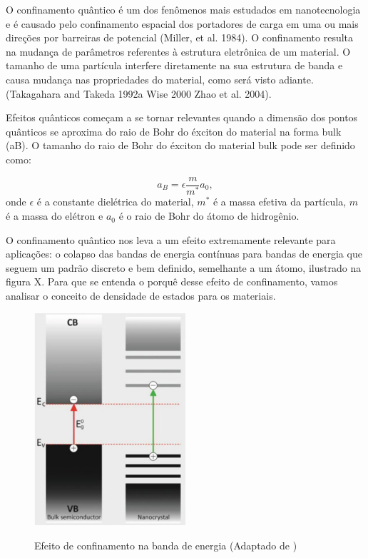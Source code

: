 \par O confinamento quântico é um  dos fenômenos mais estudados em nanotecnologia e é causado pelo confinamento espacial dos portadores de carga em uma ou mais direções por barreiras de potencial (Miller, et al. 1984). O confinamento resulta na mudança de parâmetros referentes à estrutura eletrônica de um material. O tamanho de uma partícula interfere diretamente na sua estrutura de banda e causa mudança nas propriedades do material, como será visto adiante. (Takagahara and Takeda  1992a Wise  2000 Zhao  et  al.  2004).

\par Efeitos quânticos começam a se tornar relevantes quando a dimensão dos pontos quânticos se aproxima do raio de Bohr do éxciton do material na forma bulk (aB). O tamanho do raio de Bohr do éxciton do material bulk pode ser definido\cite{confinamento1} como:

\begin{equation}
	\label{confinamento_1}
	a_{B} = \epsilon \frac{m}{m^{\ast}}a_{0},
\end{equation}
onde $\epsilon$ é a constante dielétrica do material, $m^{\ast}$ é a massa efetiva da partícula, $m$ é a massa do elétron e $a_{0}$ é o raio de Bohr do átomo de hidrogênio.
 
\par O confinamento quântico nos leva a um efeito extremamente relevante para aplicações: o colapso das bandas de energia contínuas para bandas de energia que seguem um padrão discreto e bem definido, semelhante a um átomo, ilustrado na figura X. Para que se entenda o porquê desse efeito de confinamento, vamos analisar o conceito de densidade de estados para os materiais.
\begin{figure}[H]
  \caption{Efeito de confinamento na banda de energia (Adaptado de \cite{bulk2})}
  \centering
  \includegraphics[width=0.5\textwidth]{images/figura9.jpg}
  \label{fig9}
\end{figure}